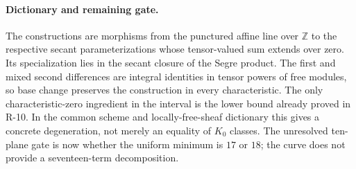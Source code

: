 \paragraph{Dictionary and remaining gate.}
The constructions are morphisms from the punctured affine line over
$\mathbb Z$ to the respective secant parameterizations whose tensor-valued
sum extends over zero.  Its specialization lies in the secant closure
of the Segre product.  The first and mixed second differences are
integral identities in tensor powers of free modules, so base change
preserves the construction in every characteristic.  The only
characteristic-zero ingredient in the interval is the lower bound
already proved in R-10.  In the common scheme and locally-free-sheaf
dictionary this gives a concrete degeneration, not merely an equality
of $K_0$ classes.  The unresolved ten-plane gate is now whether the
uniform minimum is $17$ or $18$; the curve does not provide a
seventeen-term decomposition.
